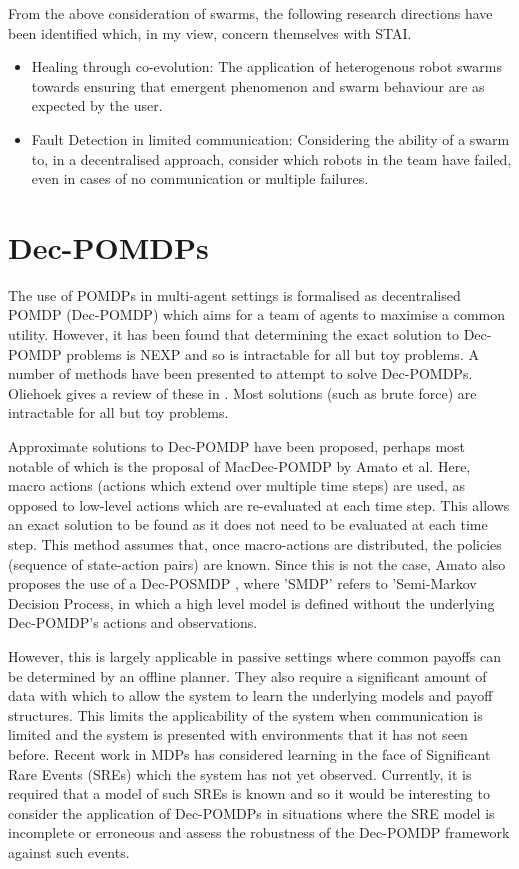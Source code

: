 \documentclass[preprint,11pt]{report}
\begin{document}
From the above consideration of swarms, the following research directions have been identified
which, in my view, concern themselves with STAI.

\begin{itemize} \item Healing through co-evolution: The application of heterogenous robot swarms
towards ensuring that emergent phenomenon and swarm behaviour are as expected by the user. \item
Fault Detection in limited communication: Considering the ability of a swarm to, in a decentralised
approach, consider which robots in the team have failed, even in cases of no communication or
multiple failures. \end{itemize}

\section{Dec-POMDPs}

The use of POMDPs in multi-agent settings is formalised as decentralised POMDP (Dec-POMDP) which
aims for a team of agents to maximise a common utility. However, it has been found that determining
the exact solution to Dec-POMDP problems is NEXP \cite{Eker2011} and so is intractable for all but
toy problems. A number of methods have been presented to attempt to solve Dec-POMDPs. Oliehoek gives
a review of these in \cite{OliehoekDecentralizedPOMDPs}. Most solutions (such as brute force) are
intractable for all but toy problems. 

Approximate solutions to Dec-POMDP have been proposed, perhaps most notable of which is the proposal
of MacDec-POMDP \cite{Amato2015} by Amato et al. Here, macro actions (actions which extend over
multiple time steps) are used, as opposed to low-level actions which are re-evaluated at each time
step. This allows an exact solution to be found as it does not need to be evaluated at each time
step. This method assumes that, once macro-actions are distributed, the policies (sequence of
state-action pairs) are known. Since this is not the case, Amato also proposes the use of a
Dec-POSMDP \cite{Amato2017Decision-MakingLearning}, where 'SMDP' refers to 'Semi-Markov Decision
Process, in which a high level model is defined without the underlying Dec-POMDP's actions and
observations.

However, this is largely applicable in passive settings where common payoffs can be determined by an
offline planner. They also require a significant amount of data with which to allow the system to
learn the underlying models and payoff structures. This limits the applicability of the system when
communication is limited and the system is presented with environments that it has not seen before.
Recent work in MDPs \cite{Klima2019RobustDomains} has considered learning in the face of Significant
Rare Events (SREs) which the system has not yet observed. Currently, it is required that a model of
such SREs is known and so it would be interesting to consider the application of Dec-POMDPs in
situations where the SRE model is incomplete or erroneous and assess the robustness of the Dec-POMDP
framework against such events. 
\end{document}
